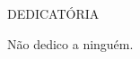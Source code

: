 \pagestyle{empty}
\large
\begin{center}
	DEDICATÓRIA
\end{center}

\normalsize

Não dedico a ninguém.
